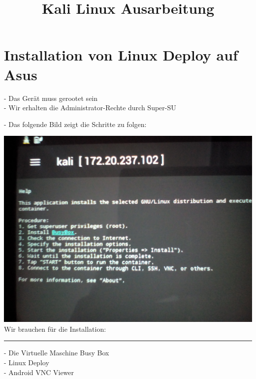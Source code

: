 \documentclass[11pt,a4paper]{article}
\begin{document}
\begin{titlepage}
\begin{figure}
\centering
\end{figure}
\title{Kali Linux Ausarbeitung}
\date{}

\maketitle
\end{titlepage}

\newpage

\section {Installation von Linux Deploy auf Asus}

- Das Gerät muss gerootet sein \\
- Wir erhalten die Administrator-Rechte durch Super-SU

- Das folgende Bild zeigt die Schritte zu folgen:


\includegraphics[scale=0.09]{./Image/img1} \\

  
  Wir brauchen für die Installation: \\   
    
       \rule{1cm}{0cm}
\parbox{\linewidth}{    
	   - Die Virtuelle Maschine Busy Box \\
       - Linux Deploy \\
       - Android VNC Viewer \\ }
       
\end{document}
